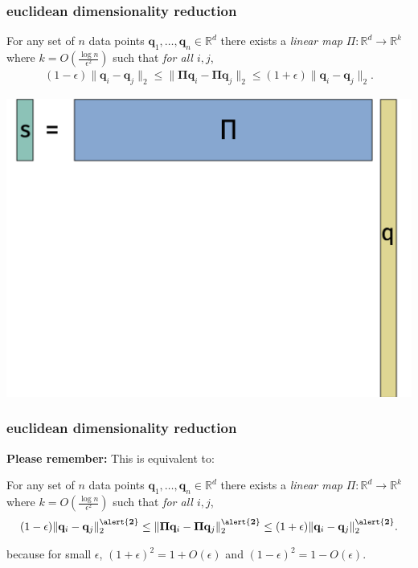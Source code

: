 \documentclass[compress,handout]{beamer}
\newcommand{\bs}[1]{\boldsymbol{#1}}
\newcommand{\bv}[1]{\mathbf{#1}}
\newcommand{\R}{\mathbb{R}}
\begin{document}
\begin{frame}
	\frametitle{euclidean dimensionality reduction}
	\begin{lemma}
		For any set of $n$ data points $\bv{q}_1,\ldots, \bv{q}_n \in \R^d$ there exists a \emph{linear map} $\Pi: \R^d \rightarrow \R^k$ where $k = O\left(\frac{\log n}{\epsilon^2}\right)$ such that \emph{for all $i,j$},
			\begin{align*}
			(1-\epsilon)\|\bv{q}_i - \bv{q}_j\|_2 \leq \|\bs{\Pi}\bv{q}_i - \bs{\Pi}\bv{q}_j\|_2 \leq (1+\epsilon)\|\bv{q}_i - \bv{q}_j\|_2.
			\end{align*}
	\end{lemma}
	\begin{center}
		\includegraphics[height=.45\textheight]{jl_sketch.png}
	\end{center}
\end{frame}

\begin{frame}
	\frametitle{euclidean dimensionality reduction}
	\textbf{Please remember:} This is equivalent to: 
	\begin{lemma}
		For any set of $n$ data points $\bv{q}_1,\ldots, \bv{q}_n \in \R^d$ there exists a \emph{linear map} $\Pi: \R^d \rightarrow \R^k$ where $k = O\left(\frac{\log n}{\epsilon^2}\right)$ such that \emph{for all $i,j$},
		\begin{align*}
			(1-\epsilon)\|\bv{q}_i - \bv{q}_j\|_2^{\mathbf{\alert{2}}} \leq \|\bs{\Pi}\bv{q}_i - \bs{\Pi}\bv{q}_j\|_2^{\mathbf{\alert{2}}} \leq (1+\epsilon)\|\bv{q}_i - \bv{q}_j\|_2^{\mathbf{\alert{2}}}.
		\end{align*}
	\end{lemma}
	because for small $\epsilon$, $(1+\epsilon)^2 = 1 + O(\epsilon)$ and $(1-\epsilon)^2 = 1 - O(\epsilon)$.
\end{frame}
\end{document}
